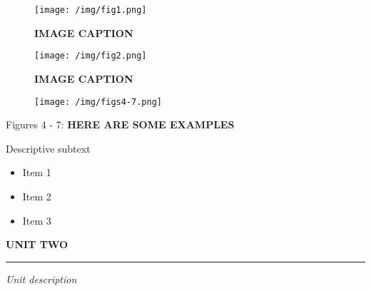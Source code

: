 \documentclass[a4paper,12pt,twoside]{book}
\begin{document}
\begin{figure}[h!]
  \centering
  \texttt{[image: /img/fig1.png]}
  \caption{\bf{IMAGE CAPTION}}
\end{figure}

\vspace{20pt}

\begin{figure}[h!]
  \centering
  \texttt{[image: /img/fig2.png]}
  \caption{\bf{IMAGE CAPTION}}
\end{figure}

\newpage

\begin{figure}[h!]
  \centering
  \texttt{[image: /img/figs4-7.png]}
\end{figure}
\begin{center}

Figures 4 - 7: {\bf{HERE ARE SOME EXAMPLES}}
\end{center}

\setcounter{figure}{7}

\vspace{35pt}

Descriptive subtext
\vspace{8pt}

\begin{itemize}
\item Item 1
\item Item 2
\item Item 3
\end{itemize}

\newpage

\pagebreak
\hspace{0pt}
\vfill
\huge
{\bf{UNIT TWO}}
\vspace{8pt}
\hrule
\large
\begin{flushright}
{\emph{Unit description}}
\end{flushright}
\normalsize
\vfill
\hspace{0pt}
\pagebreak

\newpage
\end{document}
